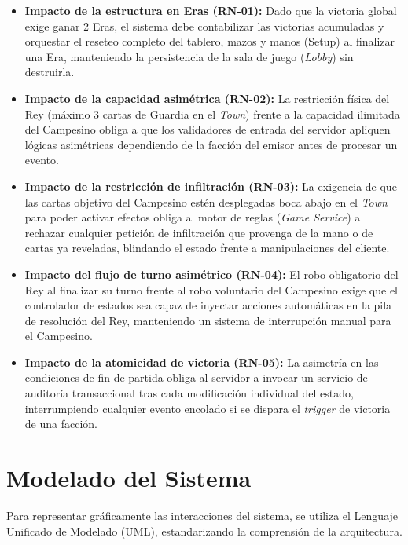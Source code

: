 \begin{itemize}
    \item \textbf{Impacto de la estructura en Eras (RN-01):} Dado que la victoria global exige ganar 2 Eras, el sistema debe contabilizar las victorias acumuladas y orquestar el reseteo completo del tablero, mazos y manos (Setup) al finalizar una Era, manteniendo la persistencia de la sala de juego (\textit{Lobby}) sin destruirla.
    
    \item \textbf{Impacto de la capacidad asimétrica (RN-02):} La restricción física del Rey (máximo 3 cartas de Guardia en el \textit{Town}) frente a la capacidad ilimitada del Campesino obliga a que los validadores de entrada del servidor apliquen lógicas asimétricas dependiendo de la facción del emisor antes de procesar un evento.
    
    \item \textbf{Impacto de la restricción de infiltración (RN-03):} La exigencia de que las cartas objetivo del Campesino estén desplegadas boca abajo en el \textit{Town} para poder activar efectos obliga al motor de reglas (\textit{Game Service}) a rechazar cualquier petición de infiltración que provenga de la mano o de cartas ya reveladas, blindando el estado frente a manipulaciones del cliente.
    
    \item \textbf{Impacto del flujo de turno asimétrico (RN-04):} El robo obligatorio del Rey al finalizar su turno frente al robo voluntario del Campesino exige que el controlador de estados sea capaz de inyectar acciones automáticas en la pila de resolución del Rey, manteniendo un sistema de interrupción manual para el Campesino.
    
    \item \textbf{Impacto de la atomicidad de victoria (RN-05):} La asimetría en las condiciones de fin de partida obliga al servidor a invocar un servicio de auditoría transaccional tras cada modificación individual del estado, interrumpiendo cualquier evento encolado si se dispara el \textit{trigger} de victoria de una facción.
\end{itemize}

\section{Modelado del Sistema}

Para representar gráficamente las interacciones del sistema, se utiliza el Lenguaje Unificado de Modelado (UML), estandarizando la comprensión de la arquitectura.

